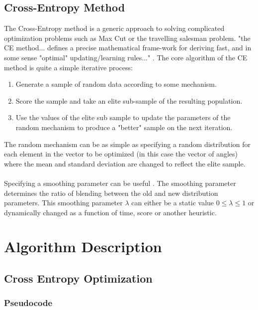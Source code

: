 \documentclass[conference,letterpaper]{IEEEtran}
\begin{document}
\subsection{Cross-Entropy Method}
The Cross-Entropy method is a generic approach to solving complicated optimization problems such as Max Cut or the travelling salesman problem. "the CE method... defines a precise mathematical frame-work for deriving fast, and in some sense "optimal" updating/learning rules..." \cite{CE}. The core algorithm of the CE method is quite a simple iterative process:
\begin{enumerate}
    \item Generate a sample of random data according to some mechanism.
    \item Score the sample and take an elite sub-sample of the resulting population.
    \item Use the values of the elite sub sample to update the parameters of the random mechanism to produce a "better" sample on the next iteration.
\end{enumerate}
The random mechanism can be as simple as specifying a random distribution for each element in the vector to be optimized (in this case the vector of angles) where the mean and standard deviation are changed to reflect the elite sample.
\\\\
Specifying a smoothing parameter can be useful \cite{CE2}. The smoothing parameter determines the ratio of blending between the old and new distribution parameters. This smoothing parameter $\lambda$ can either be a static value $0 \leq \lambda \leq 1$ or dynamically changed as a function of time, score or another heuristic.

\newpage
\section{Algorithm Description}
\subsection{Cross Entropy Optimization}
\subsubsection{Pseudocode}


% 
\end{document}

